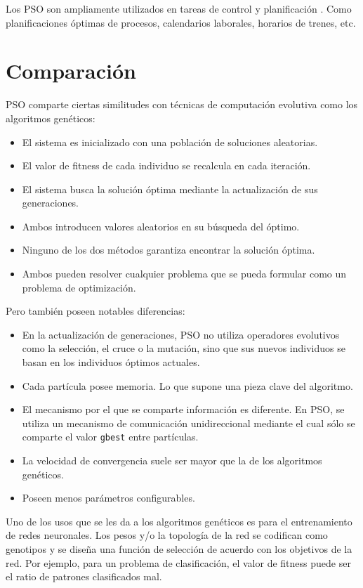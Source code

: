 \documentclass[a4paper,12pt,titlepage]{article}
\begin{document}
Los PSO son ampliamente utilizados en tareas de control y planificación . Como planificaciones óptimas de procesos, calendarios laborales, horarios de trenes, etc.


\section{Comparación}

PSO comparte ciertas similitudes con técnicas de computación evolutiva como los algoritmos genéticos:

\begin{itemize}[noitemsep]
	\item El sistema es inicializado con una población de soluciones aleatorias.
	\item El valor de fitness de cada individuo se recalcula en cada iteración.
	\item El sistema busca la solución óptima mediante la actualización de sus generaciones.
	\item Ambos introducen valores aleatorios en su búsqueda del óptimo.
	\item Ninguno de los dos métodos garantiza encontrar la solución óptima.
	\item Ambos pueden resolver cualquier problema que se pueda formular como un problema de optimización.
\end{itemize}

Pero también poseen notables diferencias:

\begin{itemize}[noitemsep]
	\item En la actualización de generaciones, PSO no utiliza operadores evolutivos como la selección, el cruce o la mutación, sino que sus nuevos individuos se basan en los individuos óptimos actuales.
	\item Cada partícula posee memoria. Lo que supone una pieza clave del algoritmo.
	\item El mecanismo por el que se comparte información es diferente. En PSO, se utiliza un mecanismo de comunicación unidireccional mediante el cual sólo se comparte el valor  \lstinline|gbest| entre partículas.
	\item La velocidad de convergencia suele ser mayor que la de los algoritmos genéticos.
	\item Poseen menos parámetros configurables.
\end{itemize}

Uno de los usos que se les da a los algoritmos genéticos es para el entrenamiento de redes neuronales. Los pesos y/o la topología de la red se codifican como genotipos y se diseña una función de selección de acuerdo con los objetivos de la red. Por ejemplo, para un problema de clasificación, el valor de fitness puede ser el ratio de patrones clasificados mal.
\end{document}
